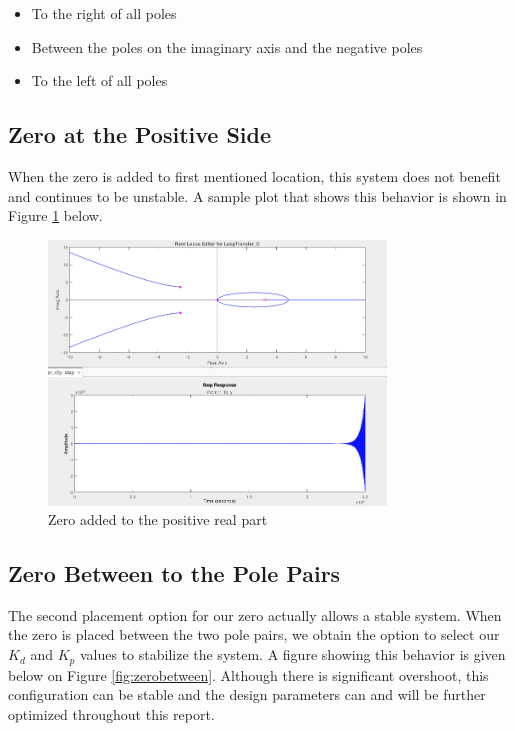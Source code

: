 \begin{itemize}
    \item To the right of all poles
    \item Between the poles on the imaginary axis and the negative poles
    \item To the left of all poles
    
\end{itemize}

\subsection{Zero at the Positive Side}
When the zero is added to first mentioned location, this system does not benefit and continues to be unstable. A sample plot that shows this behavior is shown in Figure \ref{fig:zeroright} below.

\begin{figure}[H]
    \centering
    \includegraphics[width=0.8\textwidth]{images/zero_positive.png}
    \caption{Zero added to the positive real part}
    \label{fig:zeroright}
\end{figure}


\subsection{Zero Between to the Pole Pairs}
The second placement option for our zero actually allows a stable system. When the zero is placed between the two pole pairs, we obtain the option to select our $K_d$ and $K_p$ values to stabilize the system. A figure showing this behavior is given below on Figure \ref{fig:zerobetween}. Although there is significant overshoot, this configuration can be stable and the design parameters can and will be further optimized throughout this report.

